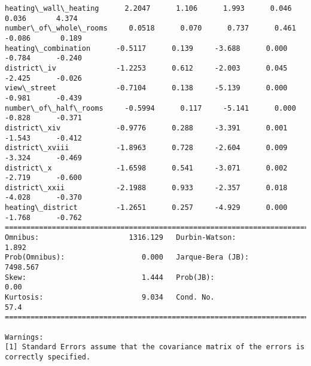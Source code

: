 \documentclass[11pt]{article}
\begin{document}
\begin{Verbatim}[commandchars=\\\{\}]
heating\_wall\_heating      2.2047      1.106      1.993      0.046       0.036       4.374
number\_of\_whole\_rooms     0.0518      0.070      0.737      0.461      -0.086       0.189
heating\_combination      -0.5117      0.139     -3.688      0.000      -0.784      -0.240
district\_iv              -1.2253      0.612     -2.003      0.045      -2.425      -0.026
view\_street              -0.7104      0.138     -5.139      0.000      -0.981      -0.439
number\_of\_half\_rooms     -0.5994      0.117     -5.141      0.000      -0.828      -0.371
district\_xiv             -0.9776      0.288     -3.391      0.001      -1.543      -0.412
district\_xviii           -1.8963      0.728     -2.604      0.009      -3.324      -0.469
district\_x               -1.6598      0.541     -3.071      0.002      -2.719      -0.600
district\_xxii            -2.1988      0.933     -2.357      0.018      -4.028      -0.370
heating\_district         -1.2651      0.257     -4.929      0.000      -1.768      -0.762
==============================================================================
Omnibus:                     1316.129   Durbin-Watson:                   1.892
Prob(Omnibus):                  0.000   Jarque-Bera (JB):             7498.567
Skew:                           1.444   Prob(JB):                         0.00
Kurtosis:                       9.034   Cond. No.                         57.4
==============================================================================

Warnings:
[1] Standard Errors assume that the covariance matrix of the errors is correctly specified.

    \end{Verbatim}
\end{document}
